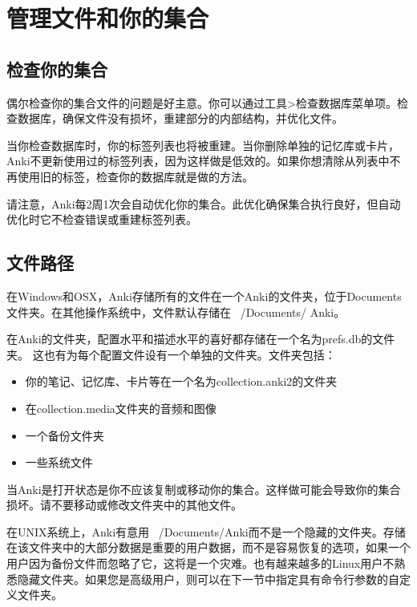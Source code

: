 \documentclass[a4paper]{book}
\begin{document}
			\chapter{管理文件和你的集合}\label{}
			
			\section{检查你的集合}
			偶尔检查你的集合文件的问题是好主意。你可以通过工具>检查数据库菜单项。检查数据库，确保文件没有损坏，重建部分的内部结构，并优化文件。
			
			当你检查数据库时，你的标签列表也将被重建。当你删除单独的记忆库或卡片，Anki不更新使用过的标签列表，因为这样做是低效的。如果你想清除从列表中不再使用旧的标签，检查你的数据库就是做的方法。
			
			请注意，Anki每2周1次会自动优化你的集合。此优化确保集合执行良好，但自动优化时它不检查错误或重建标签列表。
			
			\section{文件路径}
			
			在Windows和OSX，Anki存储所有的文件在一个Anki的文件夹，位于Documents文件夹。在其他操作系统中，文件默认存储在~ /Documents/ Anki。
			
			在Anki的文件夹，配置水平和描述水平的喜好都存储在一个名为prefs.db的文件夹。
			这也有为每个配置文件设有一个单独的文件夹。文件夹包括：
			
			\begin{itemize}
				\itemsep1pt\parskip0pt
				\item 你的笔记、记忆库、卡片等在一个名为collection.anki2的文件夹
				\item 在collection.media文件夹的音频和图像
				\item 一个备份文件夹
				\item 一些系统文件
			\end{itemize}
			
			\begin{shaded}
				当Anki是打开状态是你不应该复制或移动你的集合。这样做可能会导致你的集合损坏。请不要移动或修改文件夹中的其他文件。
			\end{shaded}
			
			\begin{shaded}
				在UNIX系统上，Anki有意用~ /Documents/Anki而不是一个隐藏的文件夹。存储在该文件夹中的大部分数据是重要的用户数据，而不是容易恢复的选项，如果一个用户因为备份文件而忽略了它，这将是一个灾难。也有越来越多的Linux用户不熟悉隐藏文件夹。如果您是高级用户，则可以在下一节中指定具有命令行参数的自定义文件夹。
			\end{shaded}
\end{document}
